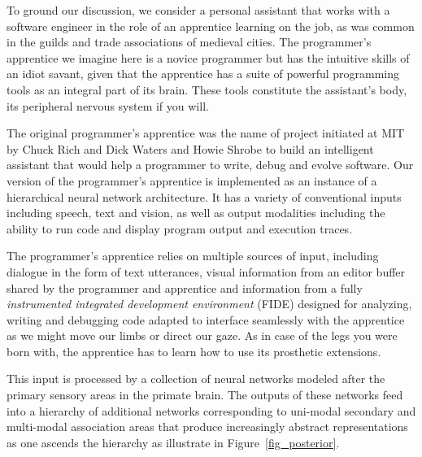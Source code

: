 \documentclass[letterpaper,11pt]{article}
\def\urlh#1{{}}
\begin{document}
To ground our discussion, we consider a personal assistant that works with a software engineer in the role of an apprentice learning on the job, as was common in the guilds and trade associations of medieval cities. The programmer's apprentice we imagine here is a novice programmer but has the intuitive skills of an idiot savant, given that the apprentice has a suite of powerful programming tools as an integral part of its brain. These tools constitute the assistant's body, its peripheral nervous system if you will.

The original programmer's apprentice was the name of project initiated at MIT by Chuck Rich and Dick Waters and Howie Shrobe to build an intelligent assistant that would help a programmer to write, debug and evolve software. Our version of the programmer's apprentice is implemented as an instance of a hierarchical neural network architecture. It has a variety of conventional inputs including speech, text and vision, as well as output modalities including the ability to run code and display program output and execution traces. 

The programmer's apprentice relies on multiple sources of input, including dialogue in the form of text utterances, visual information from an editor buffer shared by the programmer and apprentice and information from a fully {\it{instrumented integrated development environment}} (FIDE) designed for analyzing, writing and debugging code adapted to interface seamlessly with the apprentice as we might move our limbs or direct our gaze. As in case of the legs you were born with, the apprentice has to learn how to use its prosthetic extensions.

This input is processed by a collection of neural networks modeled after the primary sensory areas in the primate brain. The outputs of these networks feed into a hierarchy of additional networks corresponding to uni-modal secondary and multi-modal association areas that produce increasingly abstract representations as one ascends the hierarchy as illustrate in Figure~{\urlh{#fig_Posterior_Cortex_Semantic_Cloud_Memory}{\ref{fig_posterior}}}.
  
\end{document}
